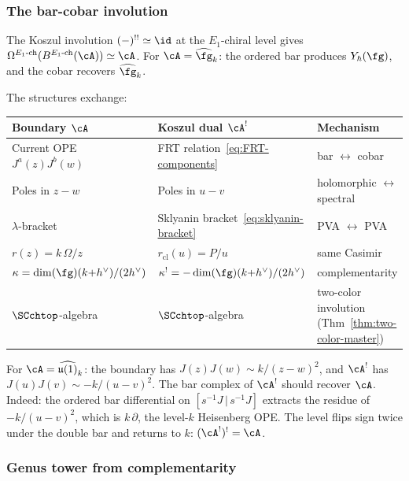 \subsubsection*{The bar-cobar involution}

The Koszul involution $(-)^{!!} \simeq \id$ at the
$E_1$-chiral level gives
$\Omega^{E_1\text{-ch}}(B^{E_1\text{-ch}}(\cA)) \simeq \cA$.
For $\cA = \widehat{\fg}_k$: the ordered bar produces
$Y_\hbar(\fg)$, and the cobar recovers $\widehat{\fg}_k$.

The structures exchange:
\begin{center}
\small
\renewcommand{\arraystretch}{1.15}
\begin{tabular}{lll}
\textbf{Boundary $\cA$} &
 \textbf{Koszul dual $\cA^!$} &
 \textbf{Mechanism} \\
\hline
Current OPE $J^a(z)J^b(w)$ &
 FRT relation~\eqref{eq:FRT-components} &
 bar $\leftrightarrow$ cobar \\[2pt]
Poles in $z - w$ &
 Poles in $u - v$ &
 holomorphic $\leftrightarrow$ spectral \\[2pt]
$\lambda$-bracket &
 Sklyanin bracket~\eqref{eq:sklyanin-bracket} &
 PVA $\leftrightarrow$ PVA \\[2pt]
$r(z) = k\,\Omega/z$ &
 $r_{\mathrm{cl}}(u) = P/u$ &
 same Casimir \\[2pt]
$\kappa = \dim(\fg)(k{+}h^\vee)/(2h^\vee)$ &
 $\kappa^! = -\dim(\fg)(k{+}h^\vee)/(2h^\vee)$ &
 complementarity \\[2pt]
$\SCchtop$-algebra &
 $\SCchtop$-algebra &
 two-color involution (Thm~\ref{thm:two-color-master})
\end{tabular}
\end{center}

\begin{computation}
For $\cA = \widehat{\mathfrak{u}(1)}_k$: the boundary has
$J(z)J(w) \sim k/(z-w)^2$, and $\cA^!$ has
$J(u)J(v) \sim -k/(u-v)^2$. The bar complex of $\cA^!$
should recover $\cA$. Indeed: the ordered bar differential on
$[s^{-1}J \,|\, s^{-1}J]$ extracts the
residue of $-k/(u-v)^2$, which is $k\,\partial$, the level-$k$
Heisenberg OPE. The level flips sign twice under the double
bar and returns to $k$: $(\cA^!)^! = \cA$.
\end{computation}

\subsubsection*{Genus tower from complementarity}

